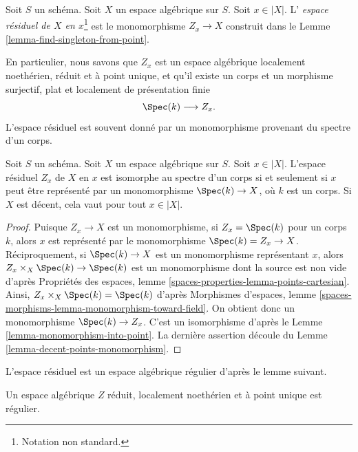 \begin{definition}
\label{definition-residual-space}
Soit $S$ un schéma.
Soit $X$ un espace algébrique sur $S$. Soit $x \in |X|$.
L'
{\it espace résiduel de $X$ en $x$}\footnote{Notation non standard.}
est le monomorphisme $Z_x \to X$ construit dans le
Lemme \ref{lemma-find-singleton-from-point}.
\end{definition}

\noindent
En particulier, nous savons que $Z_x$ est un espace algébrique
localement noethérien, réduit et à point unique,
et qu'il existe un corps et un morphisme surjectif, plat et localement
de présentation finie
$$
\Spec(k) \longrightarrow Z_x.
$$
L'espace résiduel est souvent donné par un monomorphisme
provenant du spectre d'un corps.

\begin{lemma}
\label{lemma-residual-space-monomorphism}
Soit $S$ un schéma. Soit $X$ un espace algébrique sur $S$. Soit $x \in |X|$.
L'espace résiduel $Z_x$ de $X$ en $x$ est isomorphe au spectre d'un corps
si et seulement si $x$ peut être représenté par un monomorphisme
$\Spec(k) \to X$, où $k$ est un corps. Si $X$ est décent, cela vaut pour
tout $x \in |X|$.
\end{lemma}

\begin{proof}
Puisque $Z_x \to X$ est un monomorphisme, si $Z_x = \Spec(k)$ pour un corps
$k$, alors $x$ est représenté par le monomorphisme $\Spec(k) = Z_x \to X$.
Réciproquement, si $\Spec(k) \to X$ est un monomorphisme représentant $x$,
alors $Z_x \times_X \Spec(k) \to \Spec(k)$ est un monomorphisme dont la source
est non vide d'après Propriétés des espaces, lemme
\ref{spaces-properties-lemma-points-cartesian}.
Ainsi, $Z_x \times_X \Spec(k) = \Spec(k)$ d'après Morphismes d'espaces, lemme
\ref{spaces-morphisms-lemma-monomorphism-toward-field}.
On obtient donc un monomorphisme $\Spec(k) \to Z_x$. C'est
un isomorphisme d'après le Lemme \ref{lemma-monomorphism-into-point}.
La dernière assertion découle du Lemme \ref{lemma-decent-points-monomorphism}.
\end{proof}

\noindent
L'espace résiduel est un espace algébrique régulier d'après le lemme suivant.

\begin{lemma}
\label{lemma-residual-space-regular}
Un espace algébrique $Z$ réduit, localement noethérien et à point unique
est régulier.
\end{lemma}

